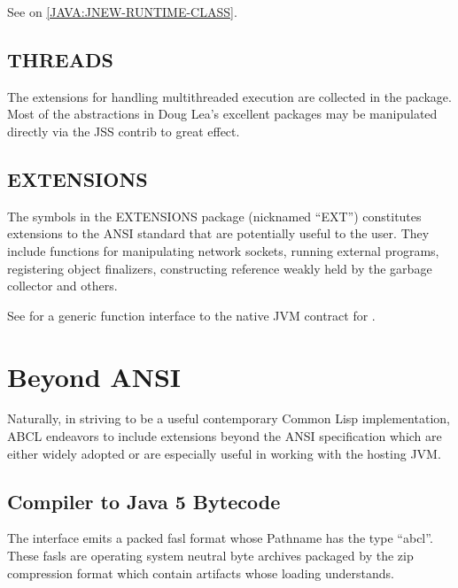 \documentclass[10pt]{book}
\begin{document}
See  on \ref{JAVA:JNEW-RUNTIME-CLASS}.



\section{THREADS}

The extensions for handling multithreaded execution are collected in
the  package.  Most of the abstractions in Doug Lea's
excellent  packages may be manipulated
directly via the JSS contrib to great effect.



\section{EXTENSIONS}

The symbols in the EXTENSIONS package (nicknamed ``EXT'') constitutes
extensions to the \textsc{ANSI} standard that are potentially useful to the
user.  They include functions for manipulating network sockets,
running external programs, registering object finalizers, constructing
reference weakly held by the garbage collector and others.

See \cite{RHODES2007} for a generic function interface to the native
\textsc{JVM} contract for .



\chapter{Beyond ANSI}

Naturally, in striving to be a useful contemporary Common Lisp
implementation, ABCL endeavors to include extensions beyond the ANSI
specification which are either widely adopted or are especially useful
in working with the hosting \textsc{JVM}.

\section{Compiler to Java 5 Bytecode}

The  interface emits a packed fasl format whose
Pathname has the type  ``abcl''.  These fasls are operating system neutral
byte archives packaged by the zip compression format which contain
artifacts whose loading  understands.
\end{document}
